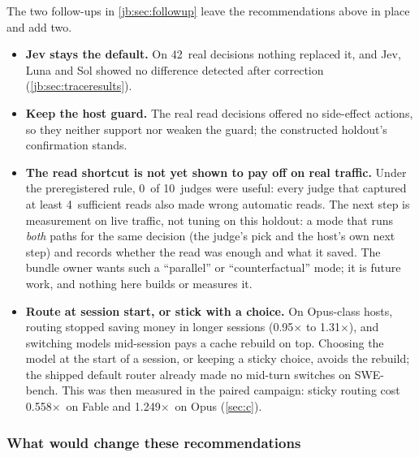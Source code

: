 \documentclass[11pt,letterpaper]{article}
\newcommand{\X}{\ensuremath{\times}}
\newcommand{\CfFableStickyPair}{0.558}
\newcommand{\CfOpusStickyPair}{1.249}
\newcommand{\CaOpusRoutedFour}{1.31}
\newcommand{\CaOpusRoutedOne}{0.95}
\newcommand{\NumBase}{10}
\newcommand{\TrN}{42}
\newcommand{\TrNUseful}{0}
\newcommand{\TrUsefulMinReads}{4}
\begin{document}
The two follow-ups in \cref{jb:sec:followup} leave the recommendations above in place and add two.
\begin{itemize}
  \item \textbf{Jev stays the default.} On \TrN\ real decisions nothing replaced it, and Jev, Luna and Sol
    showed no difference detected after correction (\cref{jb:sec:traceresults}).
  \item \textbf{Keep the host guard.} The real read decisions offered no side-effect actions, so they
    neither support nor weaken the guard; the constructed holdout's confirmation stands.
  \item \textbf{The read shortcut is not yet shown to pay off on real traffic.} Under the preregistered
    rule, \TrNUseful\ of \NumBase\ judges were useful: every judge that captured at least
    \TrUsefulMinReads\ sufficient reads also made wrong automatic reads. The next step is measurement on
    live traffic, not tuning on this holdout: a mode that runs \emph{both} paths for the same decision
    (the judge's pick and the host's own next step) and records whether the read was enough and what it
    saved. The bundle owner wants such a ``parallel'' or ``counterfactual'' mode; it is future work, and
    nothing here builds or measures it.
  \item \textbf{Route at session start, or stick with a choice.} On Opus-class hosts, routing stopped
    saving money in longer sessions (\CaOpusRoutedOne$\times$ to \CaOpusRoutedFour$\times$), and switching
    models mid-session pays a cache rebuild on top. Choosing the model at the start of a session, or
    keeping a sticky choice, avoids the rebuild; the shipped default router already made no mid-turn
    switches on SWE-bench. This was then measured in the paired campaign: sticky routing cost \CfFableStickyPair\X\ on Fable and
    \CfOpusStickyPair\X\ on Opus (\cref{sec:c}).
\end{itemize}

\subsubsection{What would change these recommendations}
\end{document}

